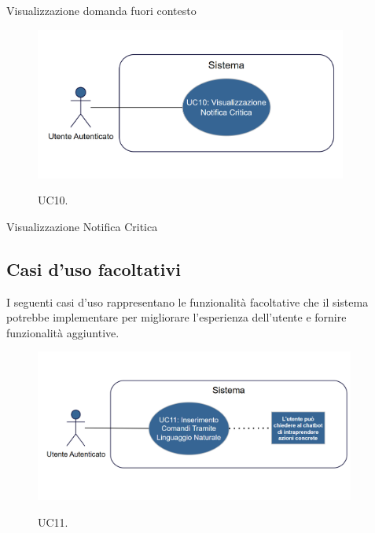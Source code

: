 \begin{usecase}{9.2}{Visualizzazione domanda fuori contesto}
\label{uc:uc9.2_fuori_contesto_nl}
\end{usecase}

\begin{figure}[htbp]
    \centering
    \includegraphics[alt={Diagramma UML Visualizzazione Notifica Critica}, height=5cm]{img/usecase/UC10.png}
    \caption{UC10.}
    \label{fig:uc10_notifiche}
\end{figure}


\begin{usecase}{10}{Visualizzazione Notifica Critica}
\label{uc:uc10_notifiche}
\end{usecase}

\subsection{Casi d'uso facoltativi}
I seguenti casi d'uso rappresentano le funzionalità facoltative che il sistema potrebbe implementare per migliorare l'esperienza dell'utente e fornire funzionalità aggiuntive.

\begin{figure}[htbp]
    \centering
    \includegraphics[alt={Diagramma UML Inserimento Comandi Tramite Linguaggio Naturale}, height=5cm]{img/usecase/UC11.png}
    \caption{UC11.}
    \label{fig:uc11_comandi_nl}
\end{figure}

